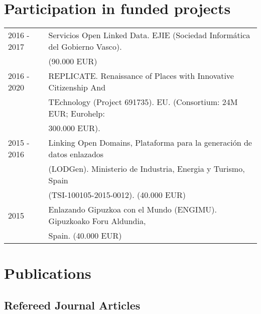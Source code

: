 \documentclass[11pt,fullpage]{article}
\begin{document}
\section*{Participation in funded projects}

\begin{tabular}{ll}
	2016 - 2017 & Servicios Open Linked Data. EJIE (Sociedad Inform\'atica del Gobierno Vasco). \\
	            & (90.000 EUR) \\
        2016 - 2020 & REPLICATE. Renaissance of Places with Innovative Citizenship And \\ 
                    & TEchnology (Project 691735). EU. (Consortium: 24M EUR; Eurohelp:  \\ 
                    & 300.000 EUR). \\
        2015 - 2016 & Linking Open Domains, Plataforma para la generaci\'on de datos enlazados  \\ 
                    & (LODGen). Ministerio de Industria, Energia y Turismo, Spain \\
                    & (TSI-100105-2015-0012). (40.000 EUR) \\
	2015 & Enlazando Gipuzkoa con el Mundo (ENGIMU). Gipuzkoako Foru Aldundia,  \\ 
	     & Spain. (40.000 EUR) \\  
\end{tabular}

\section*{Publications}
 
\subsection*{Refereed Journal Articles}

\setlength{\extrarowheight}{10pt}   
\end{document}
